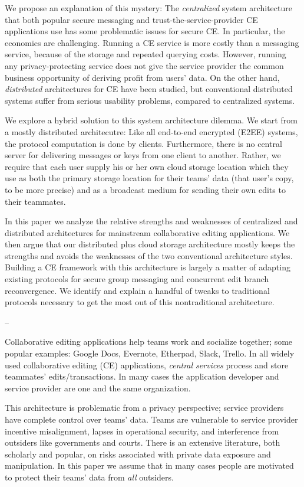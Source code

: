\documentclass[runningheads]{llncs}
\begin{document}
We propose an explanation of this mystery: The \emph{centralized} system architecture that both popular secure messaging and trust-the-service-provider CE applications use has some problematic issues for secure CE.
In particular, the economics are challenging.
Running a CE service is more costly than a messaging service, because of the storage and repeated querying costs.
However, running any privacy-protecting service does not give the service provider the common business opportunity of deriving profit from users' data.
On the other hand, \emph{distributed} architectures for CE have been studied, but conventional distributed systems suffer from serious usability problems, compared to centralized systems.

We explore a hybrid solution to this system architecture dilemma.
We start from a mostly distributed architecutre: Like all end-to-end encrypted (E2EE) systems, the protocol computation is done by clients.
Furthermore, there is no central server for delivering messages or keys from one client to another.
Rather, we require that each user supply his or her own cloud storage location which they use as both the primary storage location for their teams' data (that user's copy, to be more precise) and as a broadcast medium for sending their own edits to their teammates.

In this paper we analyze the relative strengths and weaknesses of centralized and distributed architectures for mainstream collaborative editing applications.
We then argue that our distributed plus cloud storage architecture mostly keeps the strengths and avoids the weaknesses of the two conventional architecture styles.
Building a CE framework with this architecture is largely a matter of adapting existing protocols for secure group messaging and concurrent edit branch reconvergence.
We identify and explain a handful of tweaks to traditional protocols necessary to get the most out of this nontraditional architecture.

--


Collaborative editing applications help teams work and socialize together; some popular examples: Google Docs, Evernote, Etherpad, Slack, Trello.
In all widely used collaborative editing (CE) applications, \emph{central services} process and store teammates' edits{\slash}transactions.
In many cases the application developer and service provider are one and the same organization.

This architecture is problematic from a privacy perspective; service providers have complete control over teams' data.
Teams are vulnerable to service provider incentive misalignment, lapses in operational security, and interference from outsiders like governments and courts.
There is an extensive literature, both scholarly and popular, on risks associated with private data exposure and manipulation.
In this paper we assume that in many cases people are motivated to protect their teams' data from \emph{all} outsiders.
\end{document}
